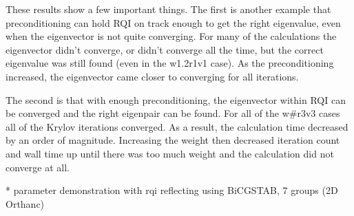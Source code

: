 These results show a few important things. The first is another example that preconditioning can hold RQI on track enough to get the right eigenvalue, even when the eigenvector is not quite converging. For many of the calculations the eigenvector didn't converge, or didn't converge all the time, but the correct eigenvalue was still found (even in the w1.2r1v1 case). As the preconditioning increased, the eigenvector came closer to converging for all iterations. 

The second is that with enough preconditioning, the eigenvector within RQI can be converged and the right eigenpair can be found. For all of the w\#r3v3 cases all of the Krylov iterations converged. As a result, the calculation time decreased by an order of magnitude. Increasing the weight then decreased iteration count and wall time up until there was too much weight and the calculation did not converge at all. 

* parameter demonstration with rqi reflecting using BiCGSTAB, 7 groups (2D Orthanc)
 
